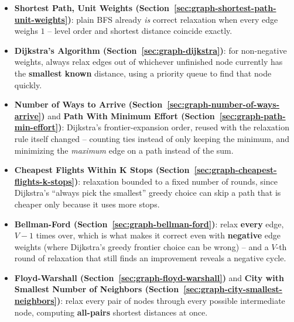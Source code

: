 \begin{patternbox}
\begin{itemize}
  \item \textbf{Shortest Path, Unit Weights (Section~\ref{sec:graph-shortest-path-unit-weights})}:
        plain BFS already \emph{is} correct relaxation when every edge
        weighs $1$ -- level order and shortest distance coincide
        exactly.
  \item \textbf{Dijkstra's Algorithm (Section~\ref{sec:graph-dijkstra})}:
        for non-negative weights, always relax edges out of whichever
        unfinished node currently has the \textbf{smallest known}
        distance, using a priority queue to find that node quickly.
  \item \textbf{Number of Ways to Arrive (Section~\ref{sec:graph-number-of-ways-arrive})}
        and \textbf{Path With Minimum Effort (Section~\ref{sec:graph-path-min-effort})}:
        Dijkstra's frontier-expansion order, reused with the
        relaxation rule itself changed -- counting ties instead of
        only keeping the minimum, and minimizing the \emph{maximum}
        edge on a path instead of the sum.
  \item \textbf{Cheapest Flights Within K Stops (Section~\ref{sec:graph-cheapest-flights-k-stops})}:
        relaxation bounded to a fixed number of rounds, since Dijkstra's
        ``always pick the smallest'' greedy choice can skip a path that
        is cheaper only because it uses more stops.
  \item \textbf{Bellman-Ford (Section~\ref{sec:graph-bellman-ford})}:
        relax \textbf{every} edge, $V{-}1$ times over, which is what
        makes it correct even with \textbf{negative} edge weights
        (where Dijkstra's greedy frontier choice can be wrong) -- and a
        $V$-th round of relaxation that still finds an improvement
        reveals a negative cycle.
  \item \textbf{Floyd-Warshall (Section~\ref{sec:graph-floyd-warshall})}
        and \textbf{City with Smallest Number of Neighbors (Section~\ref{sec:graph-city-smallest-neighbors})}:
        relax every pair of nodes through every possible intermediate
        node, computing \textbf{all-pairs} shortest distances at once.
\end{itemize}
\end{patternbox}

\newpage














